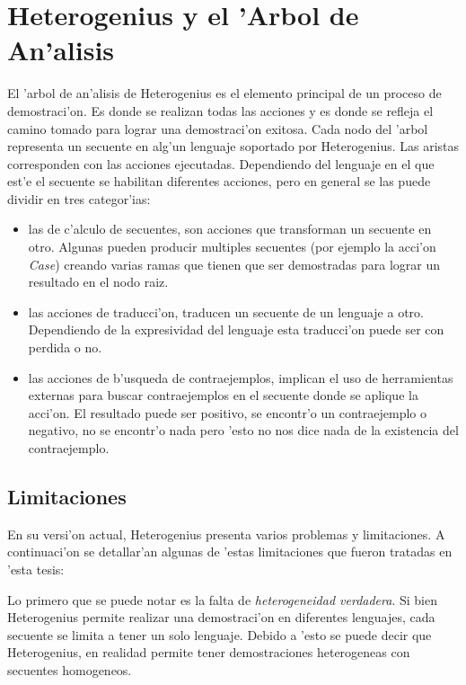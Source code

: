 \section{Heterogenius y el 'Arbol de An'alisis}

El 'arbol de an'alisis de Heterogenius es el elemento principal de un proceso de demostraci'on. Es donde se realizan todas las acciones y es donde se refleja el camino tomado para lograr una demostraci'on exitosa. Cada nodo del 'arbol representa un secuente en alg'un lenguaje soportado por Heterogenius. Las aristas corresponden con las acciones ejecutadas. Dependiendo del lenguaje en el que est'e el secuente se habilitan diferentes acciones, pero en general se las puede dividir en tres categor'ias:

\begin{itemize}
\label{clasificacion}
\item las de c'alculo de secuentes, son acciones que transforman un secuente en otro. Algunas pueden producir multiples secuentes (por ejemplo la acci'on \textit{Case}) creando varias ramas que tienen que ser demostradas para lograr un resultado en el nodo raiz.

\item las acciones de traducci'on, traducen un secuente de un lenguaje a otro. Dependiendo de la expresividad del lenguaje esta traducci'on puede ser con perdida o no.

\item las acciones de b'usqueda de contraejemplos, implican el uso de herramientas externas para buscar contraejemplos en el secuente donde se aplique la acci'on. El resultado puede ser positivo, se encontr'o un contraejemplo o negativo, no se encontr'o nada pero 'esto no nos dice nada de la existencia del contraejemplo.
\end{itemize}

\subsection{Limitaciones}

En su versi'on actual, Heterogenius presenta varios problemas y limitaciones. A continuaci'on se detallar'an algunas de 'estas limitaciones que fueron tratadas en 'esta tesis:

Lo primero que se puede notar es la falta de \textit{heterogeneidad verdadera}. Si bien Heterogenius permite realizar una demostraci'on en diferentes lenguajes, cada secuente se limita a tener un solo lenguaje. Debido a 'esto se puede decir que Heterogenius, en realidad permite tener demostraciones heterogeneas con secuentes homogeneos. 

